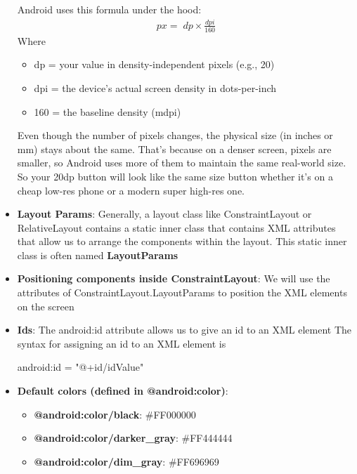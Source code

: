 \documentclass{report}
\begin{document}
\begin{itemize}
            \bigbreak \noindent 
            Android uses this formula under the hood:
            \begin{align*}
                px = \; dp \times \frac{dpi}{160}
            \end{align*}
            Where
            \begin{itemize}
                \item dp = your value in density-independent pixels (e.g., 20)
                \item dpi = the device’s actual screen density in dots-per-inch
                \item 160 = the baseline density (mdpi)
            \end{itemize}
            \bigbreak \noindent 
            Even though the number of pixels changes, the physical size (in inches or mm) stays about the same. That’s because on a denser screen, pixels are smaller, so Android uses more of them to maintain the same real-world size.
            \bigbreak \noindent 
            So your 20dp button will look like the same size button whether it’s on a cheap low-res phone or a modern super high-res one.
        \item \textbf{Layout Params}: Generally, a layout class like ConstraintLayout or RelativeLayout contains a static inner class that contains XML attributes that allow us to arrange the components within the layout. This static inner class is often named \textbf{LayoutParams}
        \item \textbf{Positioning components inside ConstraintLayout}: We will use the attributes of ConstraintLayout.LayoutParams to position the XML elements on the screen
        \item \textbf{Ids}: The android:id attribute allows us to give an id to an XML element
            \bigbreak \noindent 
            The syntax for assigning an id to an XML element is
            \bigbreak \noindent 
            \begin{xmlcode}
            android:id = "@+id/idValue"
            \end{xmlcode}
        \item \textbf{Default colors (defined in @android:color)}:
            \begin{itemize}
                \item \textbf{@android:color/black}: \#FF000000
                \item \textbf{@android:color/darker\_gray}: \#FF444444
                \item \textbf{@android:color/dim\_gray}: \#FF696969

\end{itemize}
\end{itemize}
\end{document}
